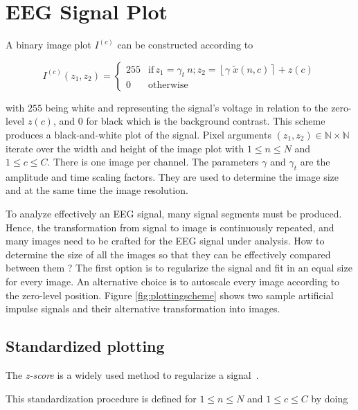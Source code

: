 \section{EEG Signal Plot}

A binary image plot $I^{(c)}$ can be constructed according to

\begin{equation}
I^{(c)}(z_1,z_2) = \left\{ \begin{array}{rl}
255 & \text{if} \,  z_1 = \gamma_{t} \  n; \! z_2 = \left\lfloor \gamma \; \tilde{x}(n,c) \right\rceil + z(c) \\
0   & \mbox{otherwise}
\end{array}\right.
\label{eq:images}
\end{equation}

\noindent with $255$ being white and representing the signal's voltage in relation to the zero-level $z(c)$, and $0$ for black which is the background contrast. This scheme produces a black-and-white plot of the signal.  Pixel arguments $ (z_1,z_2) \in \mathbb{N} \times \mathbb{N}$ iterate over the width and height of the image plot with $1 \leq n \leq N$ and $1 \leq c \leq C$.  There is one image per channel.  The parameters $\gamma$ and $\gamma_t$ are the amplitude and time scaling factors.  They are used to determine the image size and at the same time the image resolution.

To analyze effectively an EEG signal, many signal segments must be produced.  Hence, the transformation from signal to image is continuously repeated, and many images need to be crafted for the EEG signal under analysis.  How to determine the size of all the images so that they can be effectively compared between them ?  The first option is to regularize the signal and fit in an equal size for every image.  An alternative choice is to autoscale every image according to the zero-level position.  Figure \ref{fig:plottingscheme} shows two sample artificial impulse signals and their  alternative transformation into images.

\subsection{Standardized plotting}

The \textit{z-score} is a widely used method to regularize a signal~\cite{Zhang2013}.

This standardization procedure is defined for  $1 \leq n \leq N$ and $1 \leq c \leq C$ by doing

